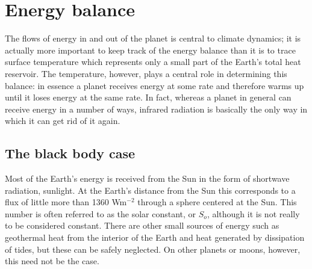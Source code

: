\documentclass[12pt]{book}
\begin{document}

\chapter{Energy balance}
The flows of energy in and out of the planet is central to climate dynamics; it is actually more important to keep track of the energy balance than it is to trace surface temperature which  represents only a small part of the Earth's total heat reservoir. The temperature, however, plays a central role in determining this balance: in essence a planet receives energy at some rate and therefore warms up until it loses energy at the same rate. In fact, whereas a planet in general can receive energy in a number of ways, infrared radiation is basically the only way in which it can get rid of it again.

\section{The black body case}
Most of the Earth's energy is received from the Sun in the form of shortwave radiation, sunlight. At the Earth's distance from the Sun this corresponds to a flux of little more than 1360 Wm$^{-2}$ through a sphere centered at the Sun. This number is often referred to as the solar constant, or $S_o$, although it is not really to be considered constant. There are other small sources of energy such as geothermal heat from the interior of the Earth and heat generated by dissipation of tides, but these can be safely neglected. On other planets or moons, however, this need not be the case.
\end{document}
